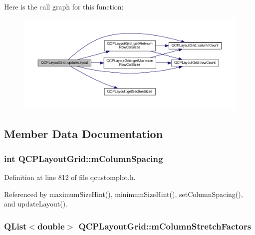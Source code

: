 Here is the call graph for this function\+:\nopagebreak
\begin{figure}[H]
\begin{center}
\leavevmode
\includegraphics[width=350pt]{class_q_c_p_layout_grid_a07f8dd7d3d61d7345026621d446042a4_cgraph}
\end{center}
\end{figure}




\subsection{Member Data Documentation}
\hypertarget{class_q_c_p_layout_grid_ae9ac48f0791be07ead0a96dbd5622770}{}
\subsubsection[{m\+Column\+Spacing}]{\setlength{\rightskip}{0pt plus 5cm}int Q\+C\+P\+Layout\+Grid\+::m\+Column\+Spacing\hspace{0.3cm}{\ttfamily [protected]}}\label{class_q_c_p_layout_grid_ae9ac48f0791be07ead0a96dbd5622770}


Definition at line 812 of file qcustomplot.\+h.



Referenced by maximum\+Size\+Hint(), minimum\+Size\+Hint(), set\+Column\+Spacing(), and update\+Layout().

\hypertarget{class_q_c_p_layout_grid_ac6aabe62339f94f18b9f8adab94b1840}{}
\subsubsection[{m\+Column\+Stretch\+Factors}]{\setlength{\rightskip}{0pt plus 5cm}Q\+List$<$double$>$ Q\+C\+P\+Layout\+Grid\+::m\+Column\+Stretch\+Factors\hspace{0.3cm}{\ttfamily [protected]}}\label{class_q_c_p_layout_grid_ac6aabe62339f94f18b9f8adab94b1840}


